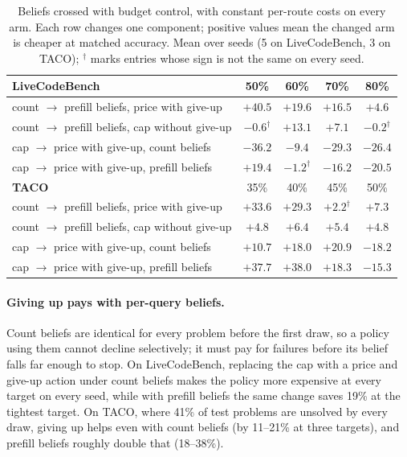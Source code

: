 \documentclass[10pt]{article} %
\begin{document}
\begin{table}[t]
\centering
\small
\caption{Beliefs crossed with budget control, with constant per-route costs on every arm.  Each
row changes one component; positive values mean the changed arm is cheaper at matched accuracy.
Mean over seeds (5 on LiveCodeBench, 3 on TACO); $^\dagger$ marks entries whose sign is not the
same on every seed.}
\label{tab:twobytwo}
\begin{tabular}{lcccc}
\toprule
\textbf{LiveCodeBench} & 50\% & 60\% & 70\% & 80\% \\
\midrule
count $\to$ prefill beliefs, price with give-up & $+40.5$ & $+19.6$ & $+16.5$ & $+4.6$ \\
count $\to$ prefill beliefs, cap without give-up & $-0.6^\dagger$ & $+13.1$ & $+7.1$ & $-0.2^\dagger$ \\
cap $\to$ price with give-up, count beliefs & $-36.2$ & $-9.4$ & $-29.3$ & $-26.4$ \\
cap $\to$ price with give-up, prefill beliefs & $+19.4$ & $-1.2^\dagger$ & $-16.2$ & $-20.5$ \\
\midrule
\textbf{TACO} & 35\% & 40\% & 45\% & 50\% \\
\midrule
count $\to$ prefill beliefs, price with give-up & $+33.6$ & $+29.3$ & $+2.2^\dagger$ & $+7.3$ \\
count $\to$ prefill beliefs, cap without give-up & $+4.8$ & $+6.4$ & $+5.4$ & $+4.8$ \\
cap $\to$ price with give-up, count beliefs & $+10.7$ & $+18.0$ & $+20.9$ & $-18.2$ \\
cap $\to$ price with give-up, prefill beliefs & $+37.7$ & $+38.0$ & $+18.3$ & $-15.3$ \\
\bottomrule
\end{tabular}
\end{table}

\paragraph{Giving up pays with per-query beliefs.}
Count beliefs are identical for every problem before the first draw, so a policy using them cannot
decline selectively; it must pay for failures before its belief falls far enough to stop.  On
LiveCodeBench, replacing the cap with a price and give-up action under count beliefs makes the
policy more expensive at every target on every seed, while with prefill beliefs the same change
saves 19\% at the tightest target.  On TACO, where 41\% of test problems are unsolved by every
draw, giving up helps even with count beliefs (by 11--21\% at three targets), and prefill beliefs
roughly double that (18--38\%).
\end{document}
